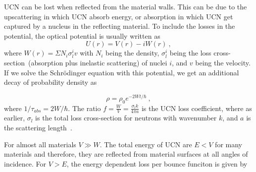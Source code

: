 UCN can be lost when reflected from the material walls.  This can be
due to the upscattering in which UCN absorb energy, or absorption in
which UCN get captured by a nucleus in the reflecting material. To
include the losses in the potential, the optical potential is usually
written as
\begin{equation}
  U(r) = V(r) - iW(r)~,
\end{equation}
where $W(r) = \Sigma N_i \sigma^i_l v$ with $N_i$ being the density,
$\sigma^i_l$ being the loss cross-section~(absorption plus inelastic
scattering) of nuclei $i$, and $v$ being the velocity. If we solve the
Schr\"{o}dinger equation with this potential, we get an additional
decay of probability density as

\begin{equation}
\rho = \rho_0 e^{-2Wt/\hbar}~,
\end{equation}
where $1/\tau_{abs} = 2W/\hbar$.  The ratio
$f = \frac{W}{V} = \frac{\sigma_l k}{4 \pi a}$ is the UCN loss
coefficient, where as earlier, $\sigma_l$ is the total loss
cross-section for neutrons with wavenumber $k$, and $a$ is the
scattering length~\cite{ucnbook}.

For almost all materials $V \gg W$. The total energy of UCN are
$E < V$ for many materials and therefore, they are reflected from
material surfaces at all angles of incidence. For $V > E$, the energy
dependent loss per bounce funciton is given by

